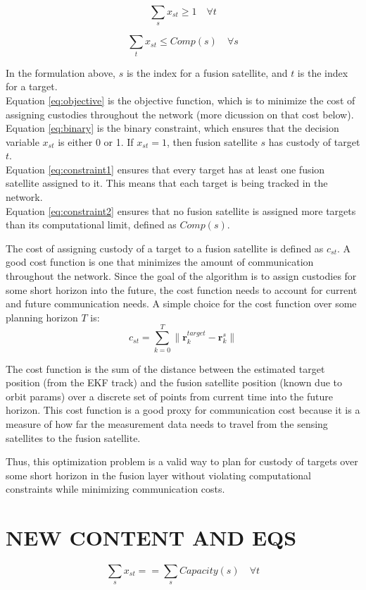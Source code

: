 \documentclass{article}
\begin{document}
    \begin{equation}
        \sum_{s} x_{st} \geq 1 \quad \forall t
        \label{eq:constraint1}
    \end{equation}

    \begin{equation}
        \sum_{t} x_{st} \leq Comp(s) \quad \forall s
        \label{eq:constraint2}
    \end{equation}

    In the formulation above, $s$ is the index for a fusion satellite, and $t$ is the index for a target. \\
    Equation \eqref{eq:objective} is the objective function, which is to minimize the cost of assigning custodies throughout the network (more dicussion on that cost below). \\
    Equation \eqref{eq:binary} is the binary constraint, which ensures that the decision variable $x_{st}$ is either 0 or 1. If $x_{st} = 1$, then fusion satellite $s$ has custody of target $t$. \\
    Equation \eqref{eq:constraint1} ensures that every target has at least one fusion satellite assigned to it. This means that each target is being tracked in the network. \\
    Equation \eqref{eq:constraint2} ensures that no fusion satellite is assigned more targets than its computational limit, defined as $Comp(s)$. 

    The cost of assigning custody of a target to a fusion satellite is defined as $c_{st}$. A good cost function is one that minimizes the amount of communication throughout the network. 
    Since the goal of the algorithm is to assign custodies for some short horizon into the future, the cost function needs to account for current and future communication needs. 
    A simple choice for the cost function over some planning horizon $T$ is:
    \begin{equation}
        c_{st} = \sum_{k=0}^{T} \| \mathbf{r}_k^{target} - \mathbf{r}_k^s \|
        \label{eq:cost}
    \end{equation}

    The cost function is the sum of the distance between the estimated target position (from the EKF track) and the fusion satellite position (known due to orbit params) over a discrete set of points from current time into the future horizon. This cost function is a good proxy for communication cost because it is a measure of how far the measurement data needs to travel from the sensing satellites to the fusion satellite.

    Thus, this optimization problem is a valid way to plan for custody of targets over some short horizon in the fusion layer without violating computational constraints while minimizing communication costs.
  

    \newpage
    \section{NEW CONTENT AND EQS}

    \begin{equation}
        \sum_{s} x_{st} == \sum_{s} Capacity(s) \quad \forall t
        \label{eq:constraint1}
    \end{equation}
\end{document}
